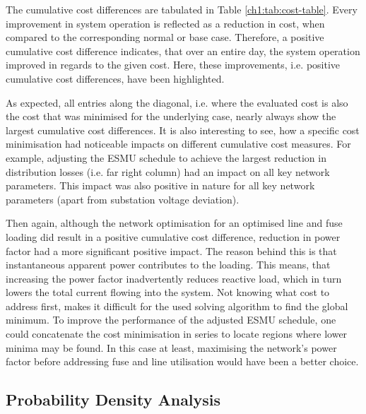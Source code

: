 

The cumulative cost differences are tabulated in Table \ref{ch1:tab:cost-table}.
Every improvement in system operation is reflected as a reduction in cost, when compared to the corresponding normal or base case.
Therefore, a positive cumulative cost difference indicates, that over an entire day, the system operation improved in regards to the given cost.
Here, these improvements, i.e. positive cumulative cost differences, have been highlighted.

As expected, all entries along the diagonal, i.e. where the evaluated cost is also the cost that was minimised for the underlying case, nearly always show the largest cumulative cost differences.
It is also interesting to see, how a specific cost minimisation had noticeable impacts on different cumulative cost measures.
For example, adjusting the ESMU schedule to achieve the largest reduction in distribution losses (i.e. far right column) had an impact on all key network parameters.
This impact was also positive in nature for all key network parameters (apart from substation voltage deviation).

Then again, although the network optimisation for an optimised line and fuse loading did result in a positive cumulative cost difference, reduction in power factor had a more significant positive impact.
The reason behind this is that instantaneous apparent power contributes to the loading.
This means, that increasing the power factor inadvertently reduces reactive load, which in turn lowers the total current flowing into the system.
Not knowing what cost to address first, makes it difficult for the used solving algorithm to find the global minimum.
To improve the performance of the adjusted ESMU schedule, one could concatenate the cost minimisation in series to locate regions where lower minima may be found.
In this case at least, maximising the network's power factor before addressing fuse and line utilisation would have been a better choice.

\subsection{Probability Density Analysis}
\label{ch1:subsec:probability-density-analysis}




